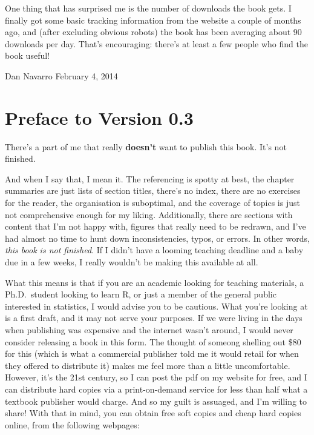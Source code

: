 \documentclass[]{book}
\begin{document}
One thing that has surprised me is the number of downloads the book gets. I finally got some basic tracking information from the website a couple of months ago, and (after excluding obvious robots) the book has been averaging about 90 downloads per day. That's encouraging: there's at least a few people who find the book useful!

Dan Navarro
February 4, 2014

\hypertarget{preface-to-version-0.3}{%
\section{Preface to Version 0.3}\label{preface-to-version-0.3}}

There's a part of me that really \textbf{doesn't} want to publish this book. It's not finished.

And when I say that, I mean it. The referencing is spotty at best, the chapter summaries are just lists of section titles, there's no index, there are no exercises for the reader, the organisation is suboptimal, and the coverage of topics is just not comprehensive enough for my liking. Additionally, there are sections with content that I'm not happy with, figures that really need to be redrawn, and I've had almost no time to hunt down inconsistencies, typos, or errors. In other words, \emph{this book is not finished}. If I didn't have a looming teaching deadline and a baby due in a few weeks, I really wouldn't be making this available at all.

What this means is that if you are an academic looking for teaching materials, a Ph.D.~student looking to learn R, or just a member of the general public interested in statistics, I would advise you to be cautious. What you're looking at is a first draft, and it may not serve your purposes. If we were living in the days when publishing was expensive and the internet wasn't around, I would never consider releasing a book in this form. The thought of someong shelling out \$80 for this (which is what a commercial publisher told me it would retail for when they offered to distribute it) makes me feel more than a little uncomfortable. However, it's the 21st century, so I can post the pdf on my website for free, and I can distribute hard copies via a print-on-demand service for less than half what a textbook publisher would charge. And so my guilt is assuaged, and I'm willing to share! With that in mind, you can obtain free soft copies and cheap hard copies online, from the following webpages:
\end{document}
